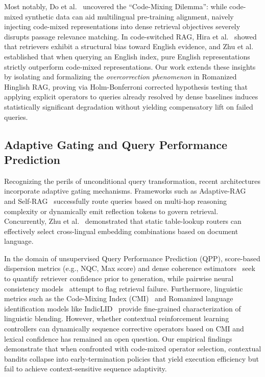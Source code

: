 \documentclass[conference]{IEEEtran}
\begin{document}
Most notably, Do et al.~\cite{do2024contrastivemix} uncovered the ``Code-Mixing Dilemma'': while code-mixed synthetic data can aid multilingual pre-training alignment, naively injecting code-mixed representations into dense retrieval objectives severely disrupts passage relevance matching. In code-switched RAG, Hira et al.~\cite{hira2026language} showed that retrievers exhibit a structural bias toward English evidence, and Zhu et al.~\cite{zhu2026when} established that when querying an English index, pure English representations strictly outperform code-mixed representations. Our work extends these insights by isolating and formalizing the \textit{overcorrection phenomenon} in Romanized Hinglish RAG, proving via Holm-Bonferroni corrected hypothesis testing that applying explicit operators to queries already resolved by dense baselines induces statistically significant degradation without yielding compensatory lift on failed queries.

\subsection{Adaptive Gating and Query Performance Prediction}
Recognizing the perils of unconditional query transformation, recent architectures incorporate adaptive gating mechanisms. Frameworks such as Adaptive-RAG~\cite{jeong2024adaptive} and Self-RAG~\cite{asai2024selfrag} successfully route queries based on multi-hop reasoning complexity or dynamically emit reflection tokens to govern retrieval. Concurrently, Zhu et al.~\cite{zhu2026when} demonstrated that static table-lookup routers can effectively select cross-lingual embedding combinations based on document language.

In the domain of unsupervised Query Performance Prediction (QPP), score-based dispersion metrics (e.g., NQC, Max score) and dense coherence estimators~\cite{vlachou2024coherence} seek to quantify retriever confidence prior to generation, while pairwise neural consistency models~\cite{singh2023unsupervised} attempt to flag retrieval failure. Furthermore, linguistic metrics such as the Code-Mixing Index (CMI)~\cite{gamback2016comparing} and Romanized language identification models like IndicLID~\cite{madhani2023indiclid} provide fine-grained characterization of linguistic blending. However, whether contextual reinforcement learning controllers can dynamically sequence corrective operators based on CMI and lexical confidence has remained an open question. Our empirical findings demonstrate that when confronted with code-mixed operator selection, contextual bandits collapse into early-termination policies that yield execution efficiency but fail to achieve context-sensitive sequence adaptivity.
\end{document}
